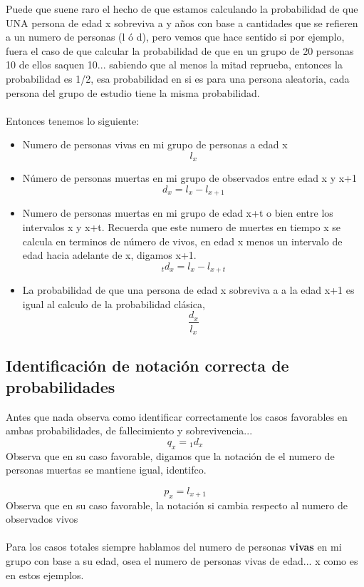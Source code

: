 \documentclass{article}
\begin{document}
Puede que suene raro el hecho de que estamos calculando la probabilidad de que UNA persona de edad x sobreviva a y años con base a cantidades que se refieren a un numero de personas (l ó d), pero vemos que hace sentido si por ejemplo, fuera el caso de que calcular la probabilidad de que en un grupo de 20 personas 10 de ellos saquen 10... sabiendo que al menos la mitad reprueba, entonces la probabilidad es 1/2, esa probabilidad en si es para una persona aleatoria, cada persona del grupo de estudio tiene la misma probabilidad.
\\\\
Entonces tenemos lo siguiente:
\begin{itemize}
    \item Numero de personas vivas en mi grupo de personas a edad x \[l_x\]
    \item Número de personas muertas en mi grupo de observados entre edad x y x+1 \[d_x = l_x - l_{x+1}\]
    \item Numero de personas muertas en mi grupo de edad x+t o bien entre los intervalos x y x+t. Recuerda que este numero de muertes en tiempo x se calcula en terminos de número de vivos, en edad x menos un intervalo de edad hacia adelante de x, digamos x+1.\[{}_td_x = l_x -l_{x+t}\]
    \item La probabilidad de que una persona de edad x sobreviva a a la edad x+1 es igual al calculo de la probabilidad clásica, \[\frac{d_x}{l_x}\]
\end{itemize}

\subsection*{Identificación de notación correcta de probabilidades}
Antes que nada observa como identificar correctamente los casos favorables en ambas probabilidades, de fallecimiento y sobrevivencia...
\[q_x = {}_1d_x\] Observa que en su caso favorable, digamos que la notación de el numero de personas muertas se mantiene igual, identifco.

\[p_x = l_{x+1}\] Observa que en su caso favorable, la notación si cambia respecto al numero de observados vivos
\\\\
Para los casos totales siempre hablamos del numero de personas \textbf{vivas} en mi grupo con base a su edad, osea el numero de personas vivas de edad... x como es en estos ejemplos.
\end{document}
